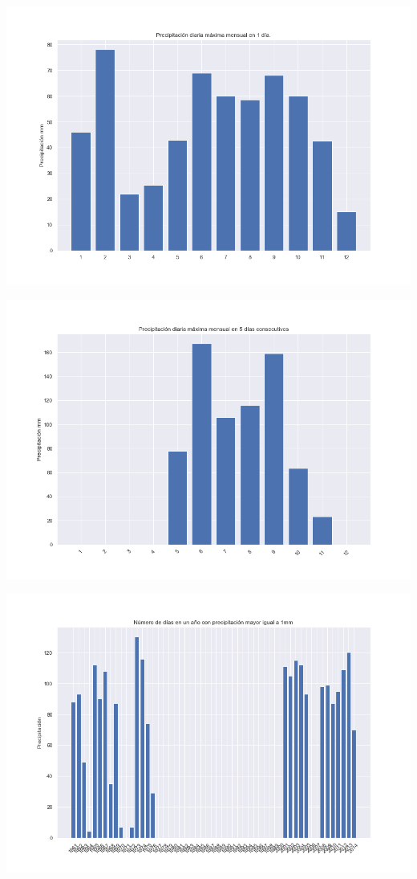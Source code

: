 \documentclass[12pt]{article}
\begin{document}
\begin{center}
\includegraphics[scale=0.5]{Rx1day.png}
\end{center} 
\begin{center}
\includegraphics[scale=0.5]{Rx5day.png}
\end{center} 
\begin{center}
\includegraphics[scale=0.5]{SDII.png}
\end{center} 
\end{document}
